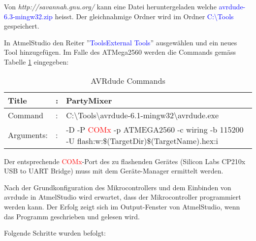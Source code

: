 Von \textit{http://savannah.gnu.org/} kann eine Datei heruntergeladen welche \textcolor{blue}{avrdude-6.3-mingw32.zip} heisst. Der gleichnahmige Ordner wird im Ordner \textcolor{blue}{C:\textbackslash Tools} gespeichert. \cite{savannahgnuorg_index_2016}

In AtmelStudio den Reiter ''\textcolor{blue}{Tools\textrightarrow External Tools}'' ausgewählen und ein neues Tool hinzugefügen. Im Falle des ATMega2560 werden die Commands gemäss Tabelle \ref{tab:AVRdude_commands} eingegeben:

\begin{table}[h!]
\center
\begin{tabularx}{\textwidth}{|l|l|X|}
\hline
Title & : & PartyMixer \\
\hline
Command & : & C:\textbackslash Tools\textbackslash avrdude-6.1-mingw32\textbackslash avrdude.exe \\
\hline
Arguments: & : & -D -P \textcolor{red}{ COMx} -p ATMEGA2560 -c wiring -b 115200 -U flash:w:\$(TargetDir)\$(TargetName).hex:i\\
\hline
\end{tabularx}
\caption{AVRdude Commands \cite{meier_mc1-skript_2017}}
\label{tab:AVRdude_commands}
\end{table}

Der entsprechende \textcolor{red}{COMx}-Port des zu flashenden Gerätes (Silicon Labs CP210x USB to UART Bridge) muss mit dem Geräte-Manager ermittelt werden.

Nach der Grundkonfiguration des Mikrocontrollers und dem Einbinden von avrdude in AtmelStudio wird erwartet, dass der Mikrocontroller programmiert werden kann. Der Erfolg zeigt sich im Output-Fenster von AtmelStudio, wenn das Programm geschrieben und gelesen wird.

Folgende Schritte wurden befolgt:

